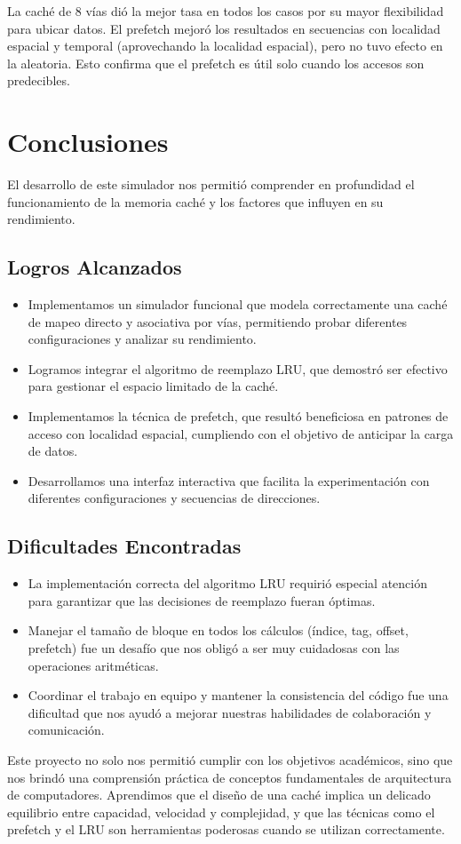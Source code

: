 \documentclass[14pt]{article}
\begin{document}
La caché de 8 vías dió la mejor tasa en todos los casos por su mayor flexibilidad para ubicar datos. El prefetch mejoró los resultados en secuencias con localidad espacial y temporal (aprovechando la localidad espacial), pero no tuvo efecto en la aleatoria. Esto confirma que el prefetch es útil solo cuando los accesos son predecibles.

\section*{Conclusiones}

El desarrollo de este simulador nos permitió comprender en profundidad el funcionamiento de la memoria caché y los factores que influyen en su rendimiento.

\subsection*{Logros Alcanzados}

\begin{itemize}
    \item Implementamos un simulador funcional que modela correctamente una caché de mapeo directo y asociativa por vías, permitiendo probar diferentes configuraciones y analizar su rendimiento.
    \item Logramos integrar el algoritmo de reemplazo LRU, que demostró ser efectivo para gestionar el espacio limitado de la caché.
    \item Implementamos la técnica de prefetch, que resultó beneficiosa en patrones de acceso con localidad espacial, cumpliendo con el objetivo de anticipar la carga de datos.
    \item Desarrollamos una interfaz interactiva que facilita la experimentación con diferentes configuraciones y secuencias de direcciones.
\end{itemize}

\subsection*{Dificultades Encontradas}

\begin{itemize}
    \item La implementación correcta del algoritmo LRU requirió especial atención para garantizar que las decisiones de reemplazo fueran óptimas.
    \item Manejar el tamaño de bloque en todos los cálculos (índice, tag, offset, prefetch) fue un desafío que nos obligó a ser muy cuidadosas con las operaciones aritméticas.
    \item Coordinar el trabajo en equipo y mantener la consistencia del código fue una dificultad que nos ayudó a mejorar nuestras habilidades de colaboración y comunicación.
\end{itemize}

Este proyecto no solo nos permitió cumplir con los objetivos académicos, sino que nos brindó una comprensión práctica de conceptos fundamentales de arquitectura de computadores. Aprendimos que el diseño de una caché implica un delicado equilibrio entre capacidad, velocidad y complejidad, y que las técnicas como el prefetch y el LRU son herramientas poderosas cuando se utilizan correctamente.
\end{document}

